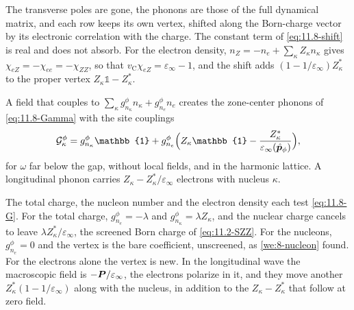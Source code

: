 The transverse poles are gone, the phonons are those of the full dynamical matrix, and each row keeps its own vertex, shifted along the Born-charge vector by its electronic correlation with the charge. The constant term of \cref{eq:11.8-shift} is real and does not absorb. For the electron density, $n_Z = -n_e + \sum_\kappa Z_\kappa n_\kappa$ gives $\chi_{eZ} = -\chi_{ee} = -\chi_{ZZ}$, so that $v_{\mathrm{C}}\chi_{eZ} = \varepsilon_\infty - 1$, and the shift adds $(1 - 1/\varepsilon_\infty)Z^*_\kappa$ to the proper vertex $Z_\kappa\mathbb{1} - Z^*_\kappa$.
\begin{keyresult}
A field that couples to $\sum_\kappa g^\phi_{n_\kappa}n_\kappa + g^\phi_{n_e}n_e$ creates the zone-center phonons of \cref{eq:11.8-Gamma} with the site couplings
\begin{equation}
  \mathcal{G}^\phi_\kappa = g^\phi_{n_\kappa}\mathbb{1} + g^\phi_{n_e}\Bigl(Z_\kappa\mathbb{1} - \frac{Z^*_\kappa}{\varepsilon_\infty(\hat{\vect{p}}_\phi)}\Bigr) ,
  \label{eq:11.8-G}
\end{equation}
for $\omega$ far below the gap, without local fields, and in the harmonic lattice. A longitudinal phonon carries $Z_\kappa - Z^*_\kappa/\varepsilon_\infty$ electrons with nucleus $\kappa$.
\end{keyresult}
\noindent The total charge, the nucleon number and the electron density each test \cref{eq:11.8-G}. For the total charge, $g^\phi_{n_e} = -\lambda$ and $g^\phi_{n_\kappa} = \lambda Z_\kappa$, and the nuclear charge cancels to leave $\lambda Z^*_\kappa/\varepsilon_\infty$, the screened Born charge of \cref{eq:11.2-SZZ}. For the nucleons, $g^\phi_{n_e} = 0$ and the vertex is the bare coefficient, unscreened, as \cref{we:8-nucleon} found. For the electrons alone the vertex is new. In the longitudinal wave the macroscopic field is $-\bm{P}/\varepsilon_\infty$, the electrons polarize in it, and they move another $Z^*_\kappa(1 - 1/\varepsilon_\infty)$ along with the nucleus, in addition to the $Z_\kappa - Z^*_\kappa$ that follow at zero field.

